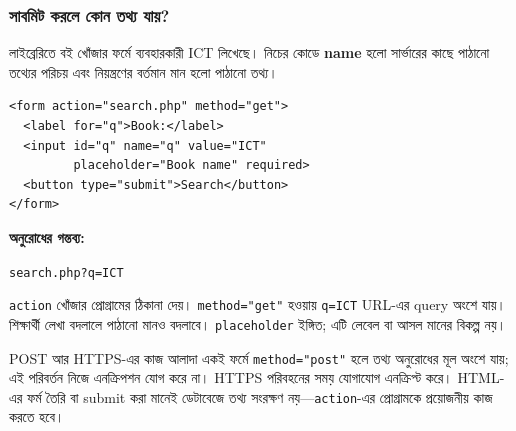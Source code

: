 \subsubsection{সাবমিট করলে কোন তথ্য যায়?}
লাইব্রেরিতে বই খোঁজার ফর্মে ব্যবহারকারী ICT লিখেছে। নিচের কোডে \textbf{name} হলো সার্ভারের কাছে পাঠানো তথ্যের পরিচয় এবং নিয়ন্ত্রণের বর্তমান মান হলো পাঠানো তথ্য।

\noindent
\begin{minipage}[t]{.50\linewidth}\vspace{0pt}
\begin{verbatim}
<form action="search.php" method="get">
  <label for="q">Book:</label>
  <input id="q" name="q" value="ICT"
         placeholder="Book name" required>
  <button type="submit">Search</button>
</form>
\end{verbatim}
\end{minipage}\hfill
\begin{minipage}[t]{.46\linewidth}\vspace{0pt}
\textbf{অনুরোধের গন্তব্য:}\par
\texttt{search.php?q=ICT}\par
\texttt{action} খোঁজার প্রোগ্রামের ঠিকানা দেয়। \texttt{method="get"} হওয়ায় \texttt{q=ICT} URL-এর query অংশে যায়। শিক্ষার্থী লেখা বদলালে পাঠানো মানও বদলাবে। \texttt{placeholder} ইঙ্গিত; এটি লেবেল বা আসল মানের বিকল্প নয়।
\end{minipage}

\begin{mistakebox}{POST আর HTTPS-এর কাজ আলাদা}
একই ফর্মে \texttt{method="post"} হলে তথ্য অনুরোধের মূল অংশে যায়; এই পরিবর্তন নিজে এনক্রিপশন যোগ করে না। HTTPS পরিবহনের সময় যোগাযোগ এনক্রিপ্ট করে। HTML-এর ফর্ম তৈরি বা submit করা মানেই ডেটাবেজে তথ্য সংরক্ষণ নয়—\texttt{action}-এর প্রোগ্রামকে প্রয়োজনীয় কাজ করতে হবে।
\end{mistakebox}
